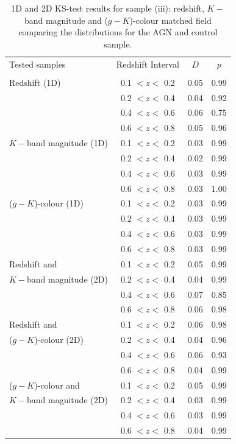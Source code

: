 \begin{table}
\centering
\caption[Sample (iii): 1D and 2D KS-test results]{1D and 2D KS-test results for sample (iii): redshift, $K-$band magnitude and ($g-K$)-colour matched field comparing the distributions for the AGN and control sample.}
\label{table:KScontrol}
\begin{tabular}{l | c c c}
\hline \hline
 Tested samples & Redshift Interval & $D$ & $p$ \\
 & & & \\
  \hline
  Redshift (1D) 					& 0.1 $< z <$ 0.2 		& 0.05 & 0.99 \\
   					 					& 0.2 $< z <$ 0.4 		& 0.04 & 0.92 \\
   										& 0.4 $< z <$ 0.6 		& 0.06 & 0.75 \\
   										& 0.6 $< z <$ 0.8 		& 0.05 & 0.96 \\
                                 
    \hline
   $K-$band magnitude (1D) 				& 0.1 $< z <$ 0.2 		& 0.03 & 0.99 \\
   										& 0.2 $< z <$ 0.4 		& 0.02 & 0.99 \\
   										& 0.4 $< z <$ 0.6 		& 0.03 & 0.99\\
    									& 0.6 $< z <$ 0.8 		& 0.03 & 1.00\\                                   
  \hline
   ($g-K$)-colour (1D) 					& 0.1 $< z <$ 0.2 		& 0.03 & 0.99 \\
   										& 0.2 $< z <$ 0.4 		& 0.03 & 0.99 \\
   										& 0.4 $< z <$ 0.6 		& 0.03 & 0.99 \\
    									& 0.6 $< z <$ 0.8 		& 0.03 & 0.99 \\
  \hline
  Redshift and 							& 0.1 $< z <$ 0.2 	& 0.05 & 0.99 \\
  	$K-$band magnitude (2D) 			& 0.2 $< z <$ 0.4  	& 0.04 & 0.99 \\
                                    	& 0.4 $< z <$ 0.6		& 0.07 & 0.85 \\
                                    	& 0.6 $< z <$ 0.8		& 0.06 & 0.98 \\

  \hline
  Redshift and 							& 0.1 $< z <$ 0.2 & 0.06 & 0.98 \\
  	($g-K$)-colour (2D) 					& 0.2 $< z <$ 0.4 & 0.04 & 0.96 \\
                                    	& 0.4 $< z <$ 0.6 & 0.06 & 0.93 \\
                                    	& 0.6 $< z <$ 0.8 & 0.04 & 0.99 \\
	
  \hline	
  ($g-K$)-colour and 						& 0.1 $< z <$ 0.2 & 0.05 & 0.99 \\
  $K-$band magnitude (2D) 				& 0.2 $< z <$ 0.4 & 0.03 & 0.99 \\
                                    	& 0.4 $< z <$ 0.6 & 0.03 & 0.99 \\
                                    	& 0.6 $< z <$ 0.8 & 0.04 & 0.99 \\
  \hline
  \end{tabular}
\end{table}

